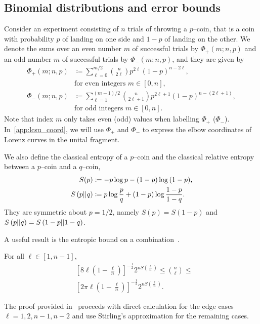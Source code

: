 \documentclass[pra,
aps,
twocolumn,
superscriptaddress,
groupedaddress,
nofootinbib,
reprint
]{revtex4-1}
\begin{document}
\subsection{Binomial distributions and error bounds}\label{app:phi}
Consider an experiment consisting of $n$ trials of throwing a $p$--coin, that is a coin with probability $p$ of landing on one side and $1-p$ of landing on the other.
We denote the sums over an even number $m$ of successful trials by $\Phi_+(m; n, p)$ and an odd number $m$ of successful trials by $\Phi_-(m; n, p)$, and they are given by
\begin{align}	
	\Phi_+(m; n, p) &\coloneqq \sum\limits_{\ell=0}^{m/2} \binom{n}{2\ell} p^{2\ell} (1-p)^{n-2\ell}, \nonumber\\ 
	&\text{for even integers } m\in[0,n], \label{eq:fp_app} \\
	\Phi_-(m; n, p) &\coloneqq \sum\limits_{\ell=1}^{(m-1)/2} \binom{n}{2\ell+1} p^{2\ell+1} (1-p)^{n-(2\ell+1)}, \nonumber\\ 
	&\text{for odd integers }m\in[0,n]. \label{eq:fn_app}
\end{align}
Note that index $m$ only takes even (odd) values when labelling $\Phi_+$ ($\Phi_-$).
In~\cref{app:lcsu_coord}, we will use $\Phi_+$ and $\Phi_-$ to express the elbow coordinates of Lorenz curves in the unital fragment.

We also define the classical entropy of a $p$--coin and the classical relative entropy between a $p$--coin and a $q$--coin,
\begin{align}
	S(p) &\coloneqq -p\log{p} -(1-p)\log{(1-p)}, \label{eq:ent}\\
	S\left( p \middle\vert\middle\vert q \right) &\coloneqq p \log{\frac{p}{q}} + (1-p) \log{\frac{1-p}{1-q}}. \label{eq:ent_rel}
\end{align}
They are symmetric about $p=1/2$, namely $S(p) = S(1-p)$ and $S\left( p \middle\vert\middle\vert q \right) = S\left( 1-p \middle\vert\middle\vert 1-q \right)$.

A useful result is the entropic bound on a combination~\cite{cit:ash}.
\begin{lemma}\label{lem:comb_bounds}
	For all $\ell\in [1,n-1]$,
	\begin{align}
		&\left[ 8\ell\left(1-\frac{\ell}{n}\right) \right]^{-\frac{1}{2}} 2^{n S\left(\frac{\ell}{n}\right)} \leq \binom{n}{\ell} \leq \\
		&\left[ 2\pi \ell\left(1-\frac{\ell}{n}\right) \right]^{-\frac{1}{2}} 2^{n S\left(\frac{\ell}{n}\right)}.
	\end{align}
\end{lemma}
The proof provided in~\cite{cit:ash} proceeds with direct calculation for the edge cases $\ell = 1,2, n-1, n-2$ and use Stirling's approximation for the remaining cases.
\end{document}

